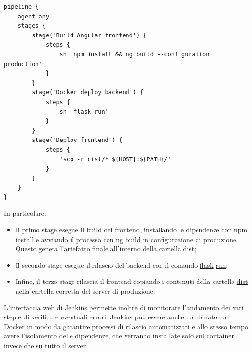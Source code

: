 \vspace{1mm}
\begin{lstlisting}[]
pipeline {
    agent any
    stages {
		stage('Build Angular frontend') {
			steps {
			    sh 'npm install && ng build --configuration production'
			}
		}
		stage('Docker deploy backend') {
			steps {
				sh 'flask run'
			}
		}
		stage('Deploy frontend') {
			steps {
			    'scp -r dist/* ${HOST}:${PATH}/'
			}
		}
    }
}
\end{lstlisting}

In particolare:

\begin{itemize}
  \item Il primo stage esegue il build del frontend, installando le dipendenze con \url{npm} \url{install} e avviando il processo con \url{ng} \url{build} in configurazione di produzione. Questo genera l'artefatto finale all'interno della cartella \url{dist};
  \item Il secondo stage esegue il rilascio del backend con il comando \url{flask} \url{run};
  \item Infine, il terzo stage rilascia il frontend copiando i contenuti della cartella \url{dist} nella cartella corretta del server di produzione.
\end{itemize}

L'interfaccia web di Jenkins permette inoltre di monitorare l'andamento dei vari step e di verificare eventuali errori. Jenkins può essere anche combinato con Docker \cite{docker} in modo da garantire processi di rilascio automatizzati e allo stesso tempo avere l'isolamento delle dipendenze, che verranno installate solo sul container invece che su tutto il server.

